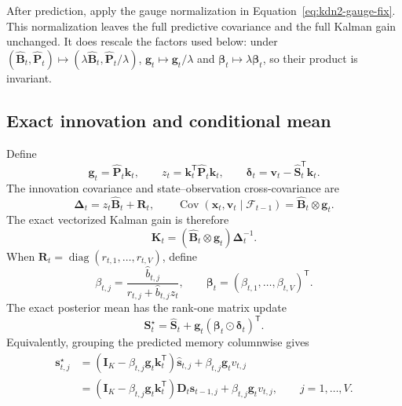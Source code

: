 \documentclass[11pt]{article}
\newcommand{\ve}[1]{\boldsymbol{#1}}
\newcommand{\tr}{\mathsf{T}}
\newcommand{\diag}{\operatorname{diag}}
\newcommand{\Cov}{\operatorname{Cov}}
\begin{document}
After prediction, apply the gauge normalization in Equation~\eqref{eq:kdn2-gauge-fix}.  This
normalization leaves the full predictive covariance and the full Kalman gain unchanged.  It does
rescale the factors used below: under
$(\widehat{\ve{B}}_t,\widehat{\ve{P}}_t)\mapsto
(\lambda\widehat{\ve{B}}_t,\widehat{\ve{P}}_t/\lambda)$,
$\ve{g}_t\mapsto\ve{g}_t/\lambda$ and
$\ve{\beta}_t\mapsto\lambda\ve{\beta}_t$, so their product is invariant.

\subsection{Exact innovation and conditional mean}

Define
\begin{equation}
  \ve{g}_t=\widehat{\ve{P}}_t\ve{k}_t,
  \qquad
  z_t=\ve{k}_t^{\tr}\widehat{\ve{P}}_t\ve{k}_t,
  \qquad
  \ve{\delta}_t=\ve{v}_t-\widehat{\ve{S}}_t^{\tr}\ve{k}_t.
  \label{eq:kdn2-key-statistics}
\end{equation}
The innovation covariance and state--observation cross-covariance are
\begin{equation}
  \ve{\Delta}_t
  =z_t\widehat{\ve{B}}_t+\ve{R}_t,
  \qquad
  \Cov(\ve{x}_t,\ve{v}_t\mid\mathcal{F}_{t-1})
  =\widehat{\ve{B}}_t\otimes\ve{g}_t.
  \label{eq:kdn2-joint-moments}
\end{equation}
The exact vectorized Kalman gain is therefore
\begin{equation}
  \ve{K}_t
  =(\widehat{\ve{B}}_t\otimes\ve{g}_t)\ve{\Delta}_t^{-1}.
  \label{eq:kdn2-vector-gain}
\end{equation}
When $\ve{R}_t=\diag(r_{t,1},\ldots,r_{t,V})$, define
\begin{equation}
  \beta_{t,j}
  =\frac{\widehat b_{t,j}}
    {r_{t,j}+\widehat b_{t,j}z_t},
  \qquad
  \ve{\beta}_t
  =(\beta_{t,1},\ldots,\beta_{t,V})^{\tr}.
  \label{eq:kdn2-value-gates}
\end{equation}
The exact posterior mean has the rank-one matrix update
\begin{equation}
  \ve{S}_t^{\star}
  =\widehat{\ve{S}}_t
   +\ve{g}_t(\ve{\beta}_t\odot\ve{\delta}_t)^{\tr}.
  \label{eq:kdn2-mean-update}
\end{equation}
Equivalently, grouping the predicted memory columnwise gives
\begin{equation}
\begin{aligned}
  \ve{s}_{t,j}^{\star}
  &=\left(
      \ve{I}_K-\beta_{t,j}\ve{g}_t\ve{k}_t^{\tr}
    \right)\widehat{\ve{s}}_{t,j}
    +\beta_{t,j}\ve{g}_tv_{t,j}
  \\
  &=\left(
      \ve{I}_K-\beta_{t,j}\ve{g}_t\ve{k}_t^{\tr}
    \right)\ve{D}_t\ve{s}_{t-1,j}
    +\beta_{t,j}\ve{g}_tv_{t,j},
  \qquad j=1,\ldots,V.
\end{aligned}
  \label{eq:kdn2-mean-column-factorized}
\end{equation}
\end{document}
